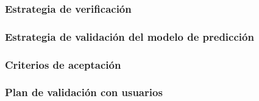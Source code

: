 
\subsubsection{Estrategia de verificación}

\subsubsection{Estrategia de validación del modelo de predicción}

\subsubsection{Criterios de aceptación}

\subsubsection{Plan de validación con usuarios}
